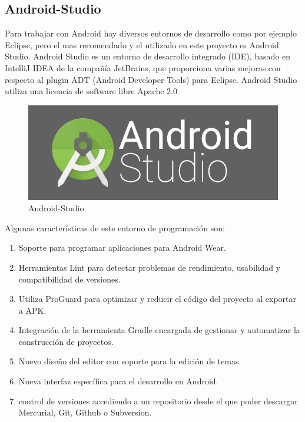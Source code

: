 \documentclass[a4paper,11pt]{book}
\begin{document}
  

\subsection{Android-Studio}

Para trabajar con Android hay diversos entornos de desarrollo como por ejemplo Eclipse, pero el mas recomendado y el utilizado en este proyecto es Android Studio\cite{as}. Android Studio es un entorno de desarrollo integrado (IDE), basado en IntelliJ IDEA de la compañía JetBrains,  que proporciona varias mejoras con respecto al plugin ADT (Android Developer Tools) para Eclipse. Android Studio utiliza una licencia de software libre Apache 2.0

\begin{figure}[H] 
\centering 
\includegraphics[scale=0.5]{imagenes/desarrollo_herramienta/android.png}
\caption{ Android-Studio}
\end{figure}


Algunas características\cite{as2} de este entorno de programación son:

\begin{enumerate}
\item Soporte para programar aplicaciones para Android Wear.
\item Herramientas Lint para detectar problemas de rendimiento, usabilidad y compatibilidad de versiones.
\item Utiliza ProGuard para optimizar y reducir el código del proyecto al exportar a APK.\item Integración de la herramienta Gradle encargada de gestionar y automatizar la construcción de proyectos.
\item Nuevo diseño del editor con soporte para la edición de temas. 
\item Nueva interfaz específica para el desarrollo en Android.
\item control de versiones accediendo a un repositorio desde el que poder descargar Mercurial, Git, Github o Subversion. 
\end{enumerate}
\end{document}
